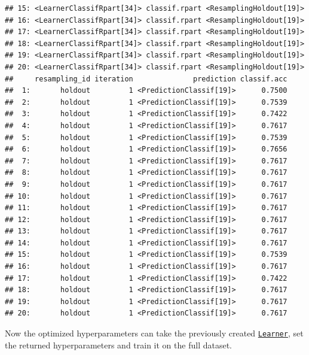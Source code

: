 \documentclass[
]{scrbook}
\newenvironment{Shaded}{\begin{snugshade}}{\end{snugshade}}
\newcommand{\FunctionTok}[1]{\textcolor[rgb]{0.00,0.00,0.00}{#1}}
\newcommand{\NormalTok}[1]{#1}
\newcommand{\OtherTok}[1]{\textcolor[rgb]{0.56,0.35,0.01}{#1}}
\newcommand{\SpecialCharTok}[1]{\textcolor[rgb]{0.00,0.00,0.00}{#1}}
\renewenvironment{Shaded} {\begin{snugshade}\small} {\end{snugshade}}
\begin{document}
\begin{verbatim}
## 15: <LearnerClassifRpart[34]> classif.rpart <ResamplingHoldout[19]>
## 16: <LearnerClassifRpart[34]> classif.rpart <ResamplingHoldout[19]>
## 17: <LearnerClassifRpart[34]> classif.rpart <ResamplingHoldout[19]>
## 18: <LearnerClassifRpart[34]> classif.rpart <ResamplingHoldout[19]>
## 19: <LearnerClassifRpart[34]> classif.rpart <ResamplingHoldout[19]>
## 20: <LearnerClassifRpart[34]> classif.rpart <ResamplingHoldout[19]>
##     resampling_id iteration              prediction classif.acc
##  1:       holdout         1 <PredictionClassif[19]>      0.7500
##  2:       holdout         1 <PredictionClassif[19]>      0.7539
##  3:       holdout         1 <PredictionClassif[19]>      0.7422
##  4:       holdout         1 <PredictionClassif[19]>      0.7617
##  5:       holdout         1 <PredictionClassif[19]>      0.7539
##  6:       holdout         1 <PredictionClassif[19]>      0.7656
##  7:       holdout         1 <PredictionClassif[19]>      0.7617
##  8:       holdout         1 <PredictionClassif[19]>      0.7617
##  9:       holdout         1 <PredictionClassif[19]>      0.7617
## 10:       holdout         1 <PredictionClassif[19]>      0.7617
## 11:       holdout         1 <PredictionClassif[19]>      0.7617
## 12:       holdout         1 <PredictionClassif[19]>      0.7617
## 13:       holdout         1 <PredictionClassif[19]>      0.7617
## 14:       holdout         1 <PredictionClassif[19]>      0.7617
## 15:       holdout         1 <PredictionClassif[19]>      0.7539
## 16:       holdout         1 <PredictionClassif[19]>      0.7617
## 17:       holdout         1 <PredictionClassif[19]>      0.7422
## 18:       holdout         1 <PredictionClassif[19]>      0.7617
## 19:       holdout         1 <PredictionClassif[19]>      0.7617
## 20:       holdout         1 <PredictionClassif[19]>      0.7617
\end{verbatim}

Now the optimized hyperparameters can take the previously created \href{https://mlr3.mlr-org.com/reference/Learner.html}{\texttt{Learner}}, set the returned hyperparameters and train it on the full dataset.

\begin{Shaded}
\end{Shaded}
\end{document}
